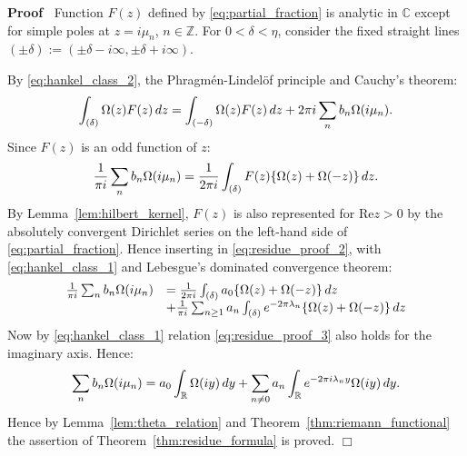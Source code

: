 \documentclass{article}
\newcommand{\assign}{:=}
\newenvironment{proof}{\noindent\textbf{Proof\ }}{\hspace*{\fill}$\Box$\medskip}
\begin{document}
\begin{proof}
  Function $F (z)$ defined by \eqref{eq:partial_fraction} is analytic in
  $\mathbb{C}$ except for simple poles at $z = i \mu_n$, $n \in \mathbb{Z}$.
  For $0 < \delta < \eta$, consider the fixed straight lines $(\pm \delta)
  \assign (\pm \delta - i \infty, \pm \delta + i \infty)$.
  
  By \eqref{eq:hankel_class_2}, the Phragm{\'e}n-Lindel{\"o}f principle and
  Cauchy's theorem:
  \begin{equation}
    \int_{(\delta)} \Omega (z) F (z)  \hspace{0.17em} dz = \int_{(- \delta)}
    \Omega (z) F (z)  \hspace{0.17em} dz + 2 \pi i \sum_n b_n \Omega (i \mu_n)
    . \label{eq:residue_proof_1}
  \end{equation}
  Since $F (z)$ is an odd function of $z$:
  \begin{equation}
    \frac{1}{\pi i}  \sum_n b_n \Omega (i \mu_n) = \frac{1}{2 \pi i} 
    \int_{(\delta)} F (z)  \{\Omega (z) + \Omega (- z)\}  \hspace{0.17em} dz.
    \label{eq:residue_proof_2}
  \end{equation}
  By Lemma~\ref{lem:hilbert_kernel}, $F (z)$ is also represented for
  $\mathrm{Re} z > 0$ by the absolutely convergent Dirichlet series on the
  left-hand side of \eqref{eq:partial_fraction}. Hence inserting in
  \eqref{eq:residue_proof_2}, with \eqref{eq:hankel_class_1} and Lebesgue's
  dominated convergence theorem:
  \begin{equation}
    \begin{array}{ll}
      \frac{1}{\pi i}  \sum_n b_n \Omega (i \mu_n) & = \frac{1}{2 \pi i} 
      \int_{(\delta)} a_0  \{\Omega (z) + \Omega (- z)\}  \hspace{0.17em} dz\\
      & + \frac{1}{\pi i}  \sum_{n \geq 1} a_n  \int_{(\delta)} e^{- 2 \pi
      \lambda_n}  \{\Omega (z) + \Omega (- z)\}  \hspace{0.17em} dz
    \end{array} \label{eq:residue_proof_3}
  \end{equation}
  Now by \eqref{eq:hankel_class_1} relation \eqref{eq:residue_proof_3} also
  holds for the imaginary axis. Hence:
  \begin{equation}
    \sum_n b_n \Omega (i \mu_n) = a_0  \int_{\mathbb{R}} \Omega (iy) 
    \hspace{0.17em} dy + \sum_{n \neq 0} a_n  \int_{\mathbb{R}} e^{- 2 \pi i
    \lambda_n y} \Omega (iy)  \hspace{0.17em} dy. \label{eq:residue_proof_4}
  \end{equation}
  Hence by Lemma~\ref{lem:theta_relation} and
  Theorem~\ref{thm:riemann_functional} the assertion of
  Theorem~\ref{thm:residue_formula} is proved.
\end{proof}
\end{document}
